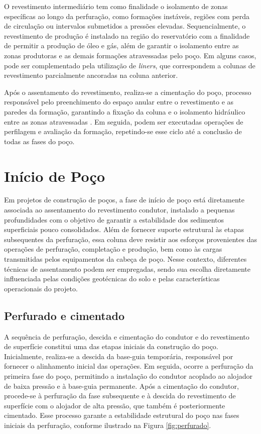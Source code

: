 O revestimento intermediário tem como finalidade o isolamento de zonas específicas ao longo da perfuração, como formações instáveis, regiões com perda de circulação ou intervalos submetidos a pressões elevadas. Sequencialmente, o revestimento de produção é instalado na região do reservatório com a finalidade de permitir a produção de óleo e gás, além de garantir o isolamento entre as zonas produtoras e as demais formações atravessadas pelo poço. Em alguns casos, pode ser complementado pela utilização de \textit{liners}, que correspondem a colunas de revestimento parcialmente ancoradas na coluna anterior.

Após o assentamento do revestimento, realiza-se a cimentação do poço, processo responsável pelo preenchimento do espaço anular entre o revestimento e as paredes da formação, garantindo a fixação da coluna e o isolamento hidráulico entre as zonas atravessadas \cite{rocha2009}. Em seguida, podem ser executadas operações de perfilagem e avaliação da formação, repetindo-se esse ciclo até a conclusão de todas as fases do poço.

\section{Início de Poço}

Em projetos de construção de poços, a fase de início de poço está diretamente associada ao assentamento do revestimento condutor, instalado a pequenas profundidades com o objetivo de garantir a estabilidade dos sedimentos superficiais pouco consolidados. Além de fornecer suporte estrutural às etapas subsequentes da perfuração, essa coluna deve resistir aos esforços provenientes das operações de perfuração, completação e produção, bem como às cargas transmitidas pelos equipamentos da cabeça de poço. Nesse contexto, diferentes técnicas de assentamento podem ser empregadas, sendo sua escolha diretamente influenciada pelas condições geotécnicas do solo e pelas características operacionais do projeto.

\subsection{Perfurado e cimentado}

A sequência de perfuração, descida e cimentação do condutor e do revestimento de superfície constitui uma das etapas iniciais da construção do poço. Inicialmente, realiza-se a descida da base-guia temporária, responsável por fornecer o alinhamento inicial das operações. Em seguida, ocorre a perfuração da primeira fase do poço, permitindo a instalação do condutor acoplado ao alojador de baixa pressão e à base-guia permanente. Após a cimentação do condutor, procede-se à perfuração da fase subsequente e à descida do revestimento de superfície com o alojador de alta pressão, que também é posteriormente cimentado. Esse processo garante a estabilidade estrutural do poço nas fases iniciais da perfuração, conforme ilustrado na Figura \ref{fig:perfurado}.


